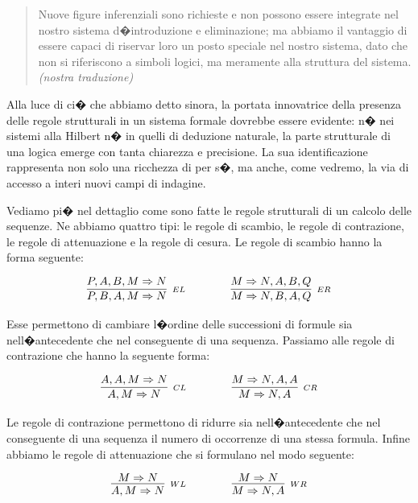 \documentclass[a4paper,12pt]{aphex}
\begin{document}
\begin{quotation}
Nuove figure inferenziali sono richieste e non possono essere integrate nel nostro sistema d�introduzione e eliminazione; ma abbiamo il vantaggio di essere capaci di riservar loro un posto speciale nel nostro sistema, dato che non si riferiscono a simboli logici, ma meramente alla struttura del sistema. \cite[p. 82]{gentzen} \emph{(nostra traduzione)}
\end{quotation}

\noindent Alla luce di ci� che abbiamo detto sinora, la portata innovatrice della presenza delle regole strutturali in un sistema formale dovrebbe essere evidente: n� nei sistemi alla Hilbert n� in quelli di deduzione naturale, la parte strutturale di una logica emerge con tanta chiarezza e precisione. La sua identificazione  rappresenta non solo una ricchezza di per s�, ma anche, come vedremo, la via di accesso a interi nuovi campi di indagine.

Vediamo pi� nel dettaglio come sono fatte le regole strutturali di un calcolo delle sequenze. Ne abbiamo quattro tipi: le regole di scambio, le regole di contrazione, le regole di attenuazione e la regole di cesura.
Le regole di scambio hanno la forma seguente:

$$\infer[_{EL}]{P, B, A, M\Rightarrow N}{P, A, B, M\Rightarrow N}\qquad\qquad\infer[_{ER}]{M\Rightarrow N, B, A, Q}{M\Rightarrow N, A, B, Q}$$

\vspace{0.2cm}


\noindent Esse permettono di cambiare l�ordine delle successioni di formule sia nell�antecedente che nel conseguente di una sequenza. Passiamo alle regole di contrazione che hanno la seguente forma:

$$\infer[_{CL}]{A, M\Rightarrow N}{A, A, M\Rightarrow N}\qquad\qquad\infer[_{CR}]{M\Rightarrow N, A}{M\Rightarrow N, A, A}$$

\vspace{0.2cm}


\noindent Le regole di contrazione permettono di ridurre sia nell�antecedente che nel conseguente di una sequenza il numero di occorrenze di una stessa formula. Infine abbiamo le regole di attenuazione che si formulano nel modo seguente:

$$\infer[_{WL}]{A, M\Rightarrow N}{M\Rightarrow N}\qquad\qquad\infer[_{WR}]{M\Rightarrow N, A}{M\Rightarrow N}$$

\vspace{0.2cm}
\end{document}
